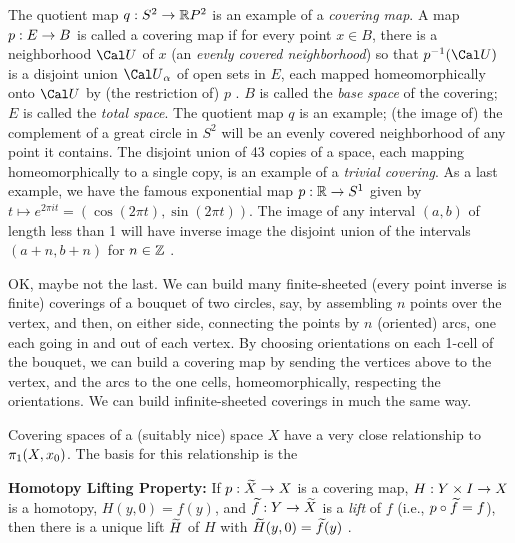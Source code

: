 \msk

The quotient map $q:S^2\rightarrow {\Bbb R}P^2$ is an example of a {\it covering map}.
A map $p:E\rightarrow B$ is called a covering map if for every point $x\in B$, there
is a neighborhood ${\Cal U}$ of $x$ (an
{\it evenly covered neighborhood}) so that $p^{-1}({\Cal U})$ 
is a disjoint union ${\Cal U}_\alpha$ of open sets in $E$, each mapped
homeomorphically onto ${\Cal U}$ by (the restriction of) $p$ . $B$ is
called the {\it base space} of the covering; $E$ is called the {\it total
space}. The quotient map $q$ is an example; (the image of) the complement
of a great circle in $S^2$ will be an evenly covered neighborhood
of any point it contains. The disjoint union of 43 copies of a space,
each mapping homeomorphically to a single copy, is an example of a 
{\it trivial covering}. As a last example, we have the famous 
exponential map $p:{\Bbb R}\rightarrow S^1$ given by $t\mapsto e^{2\pi it} = 
(\cos (2\pi t),\sin (2\pi t))$. The image of any interval $(a,b)$ of length
less than 1 will have inverse image the disjoint union of the
intervals $(a+n,b+n)$ for $n\in{\Bbb Z}$ .

\msk

OK, maybe not the last. We can build many finite-sheeted (every point
inverse is finite) coverings of a bouquet of two circles, say, by 
assembling $n$ points over the vertex, and then, on either side,
connecting the points by $n$ (oriented) arcs, one each going in and out of
each vertex. By choosing orientations on each 1-cell of the bouquet,
we can build a covering map by sending the vertices above to the
vertex, and the arcs to the one cells, homeomorphically, respecting 
the orientations. We can build infinite-sheeted coverings in much 
the same way.

\msk

\leavevmode


\epsfxsize=3in


\bsk

Covering spaces of a (suitably nice) space $X$ have a very close relationship
to $\pi_1(X,x_0)$. The basis for this relationship is the

\msk 

{\bf Homotopy Lifting Property:} If $p:\widetilde{X}\rightarrow X$ is a covering map, 
$H:Y\times I\rightarrow X$ is a homotopy, $H(y,0)=f(y)$, and
$\widetilde{f}:Y\rightarrow \widetilde{X}$ is a {\it lift} of $f$ (i.e., $p\circ \widetilde{f}=f$),
then there is a unique lift $\widetilde{H}$ of $H$ with $\widetilde{H}(y,0)=\widetilde{f}(y)$ .

\msk

